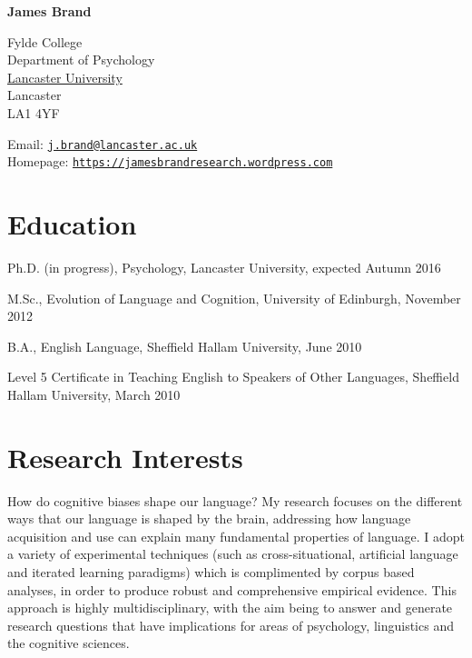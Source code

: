 \documentclass[letterpaper]{article}
\def\name{James Brand}
\renewenvironment{itemize}{
  \begin{list}{}{
    \setlength{\leftmargin}{1.5em}
  }
}{
  \end{list}
}
\begin{document}
\centerline{\huge \bf \name}
\vspace{0.25in}


 \normalsize
 Fylde College\\
 Department of Psychology\\
  \href{http://www.lancaster.ac.uk}{Lancaster University}\\
  Lancaster\\
  LA1 4YF\\
  
  \begin{minipage}{0.45\linewidth}
Email: \href{mailto:j.brand@lancaster.ac.uk}{\tt j.brand@lancaster.ac.uk}\\
Homepage: \href{https://jamesbrandresearch.wordpress.com}{\tt https://jamesbrandresearch.wordpress.com}\\
 
\end{minipage}


\section*{Education}

\begin{itemize}
  \item Ph.D. (in progress), Psychology, Lancaster University, expected Autumn 2016
  
  \item M.Sc., Evolution of Language and Cognition, University of Edinburgh, November 2012
  
  \item B.A., English Language, Sheffield Hallam University, June 2010
  
  \item Level 5 Certificate in Teaching English to Speakers of Other Languages, Sheffield Hallam University, March 2010

  

\end{itemize}

\section*{Research Interests}

How do cognitive biases shape our language? My research focuses on the different ways that our language is shaped by the brain, addressing how language acquisition and use can explain many fundamental properties of language. I adopt a variety of experimental techniques (such as cross-situational, artificial language and iterated learning paradigms) which is complimented by corpus based analyses, in order to produce robust and comprehensive empirical evidence. This approach is highly multidisciplinary, with the aim being to answer and generate research questions that have implications for areas of psychology, linguistics and the cognitive sciences.
\end{document}
